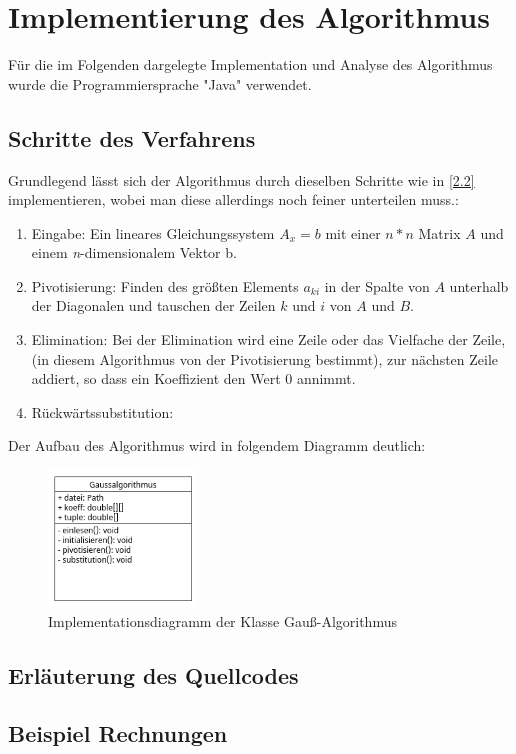 \documentclass[a4paper, 12pt]{report}
\begin{document}
\begin{sloppypar}
\chapter{Implementierung des Algorithmus}
Für die im Folgenden dargelegte Implementation und Analyse des Algorithmus wurde die Programmiersprache "Java" verwendet.
\section{Schritte des Verfahrens}
Grundlegend lässt sich der Algorithmus durch dieselben Schritte wie in \ref{2.2} implementieren, wobei man diese allerdings noch feiner unterteilen muss.:
\begin{enumerate}
    \item Eingabe: Ein lineares Gleichungssystem $ A_x=b $ mit einer $ n * n $ Matrix $A$ und einem \textit{n}-dimensionalem Vektor b.
    \item Pivotisierung: Finden des größten Elements $a_{ki}$ in der Spalte von $A$ unterhalb der Diagonalen und tauschen der Zeilen $k$ und $i$ von $A$ und $B$.
    \item Elimination:  Bei der Elimination wird eine Zeile oder das Vielfache der Zeile, (in diesem Algorithmus von der Pivotisierung bestimmt), zur nächsten Zeile addiert, so dass ein Koeffizient den Wert 0 annimmt.
    \item Rückwärtssubstitution: %
\end{enumerate}
Der Aufbau des Algorithmus wird in folgendem Diagramm deutlich:
\begin{figure}[h]
    \centering
    \includegraphics[width=150px]{"./gaussuml.png"}
    \caption{Implementationsdiagramm der Klasse Gauß-Algorithmus}
\end{figure} \newpage
\section{Erläuterung des Quellcodes}


\section{Beispiel Rechnungen}

\end{sloppypar}
\end{document}
